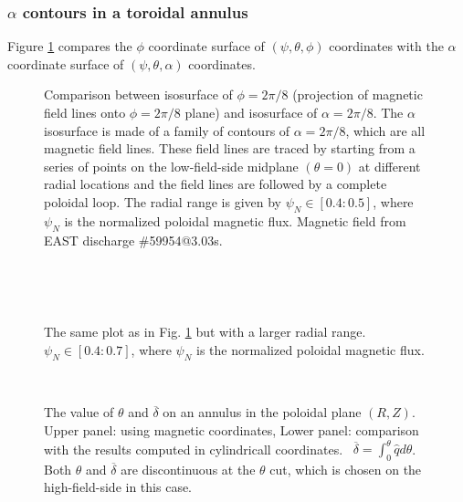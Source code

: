 \documentclass{article}
\begin{document}
\subsubsection{$\alpha$ contours in a toroidal annulus}

Figure \ref{17-9-18-1} compares the $\phi$ coordinate surface of $(\psi,
\theta, \phi)$ coordinates with the $\alpha$ coordinate surface of $(\psi,
\theta, \alpha)$ coordinates.

\begin{figure}[h]
  \caption{\label{17-9-18-1}Comparison between isosurface of $\phi = 2 \pi /
  8$ (projection of magnetic field lines onto $\phi = 2 \pi / 8$ plane) and
  isosurface of $\alpha = 2 \pi / 8$. The $\alpha$ isosurface is made of a
  family of contours of $\alpha = 2 \pi / 8$, which are all magnetic field
  lines. These field lines are traced by starting from a series of points on
  the low-field-side midplane $(\theta = 0)$ at different radial locations and
  the field lines are followed by a complete poloidal loop. The radial range
  is given by $\psi_N \in [0.4 : 0.5]$, where $\psi_N$ is the normalized
  poloidal magnetic flux. Magnetic field from EAST discharge \#59954@3.03s.}
\end{figure}

\

\

\begin{figure}[h]
  \caption{The same plot as in Fig. \ref{17-9-18-1} but with a larger radial
  range. $\psi_N \in [0.4 : 0.7]$, where $\psi_N$ is the normalized poloidal
  magnetic flux.}
\end{figure}

\begin{figure}[h]
  
  
  \
  \caption{The value of $\theta$ and $\overline{\delta}$ on an annulus in the
  poloidal plane $(R, Z)$. Upper panel: using magnetic coordinates, Lower
  panel: comparison with the results computed in cylindricall coordinates. \
  $\overline{\delta} = \int_0^{\theta} \hat{q} d \theta$. Both $\theta$ and
  $\overline{\delta}$ are discontinuous at the $\theta$ cut, which is chosen
  on the high-field-side in this case.}
\end{figure}
\end{document}
